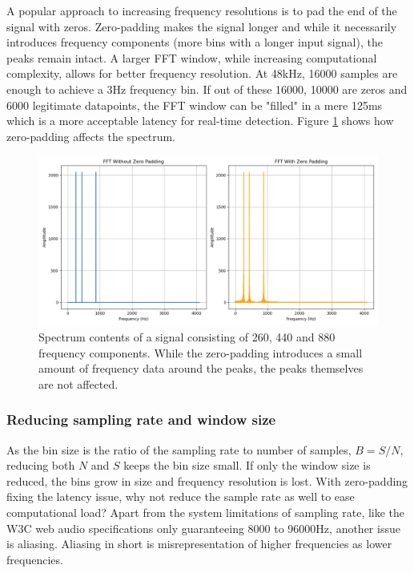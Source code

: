 A popular approach to increasing frequency resolutions is to pad the end of the signal with zeros. Zero-padding makes the signal longer and while it necessarily introduces frequency components (more bins with a longer input signal), the peaks remain intact. A larger FFT window, while increasing computational complexity, allows for better frequency resolution. At 48kHz, 16000 samples are enough to achieve a 3Hz frequency bin. If out of these 16000, 10000 are zeros and 6000 legitimate datapoints, the FFT window can be "filled" in a mere 125ms which is a more acceptable latency for real-time detection. Figure \ref{fig:zeropadSpectrum} shows how zero-padding affects the spectrum.

\begin{figure}[ht]
    \centering
    \includegraphics[width=\textwidth]{./images/zero_pad_spectrum.png}
    \caption{Spectrum contents of a signal consisting of 260, 440 and 880 frequency components. While the zero-padding introduces a small amount of frequency data around the peaks, the peaks themselves are not affected. \label{fig:zeropadSpectrum}}
\end{figure}

\subsubsection{Reducing sampling rate and window size}
As the bin size is the ratio of the sampling rate to number of samples, $B = S/N$, reducing both $N$ and $S$ keeps the bin size small. If only the window size is reduced, the bins grow in size and frequency resolution is lost. With zero-padding fixing the latency issue, why not reduce the sample rate as well to ease computational load? Apart from the system limitations of sampling rate, like the W3C web audio specifications only guaranteeing 8000 to 96000Hz, another issue is aliasing. Aliasing in short is misrepresentation of higher frequencies as lower frequencies. 

